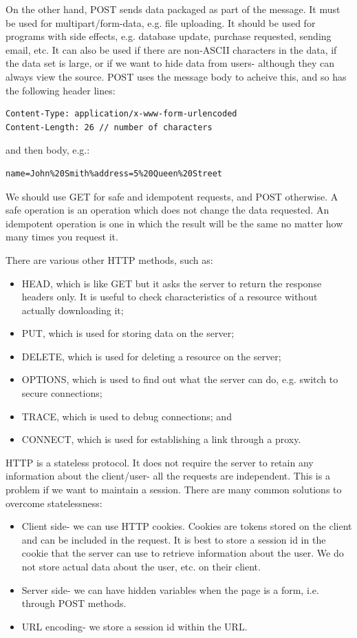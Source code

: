 \documentclass[a4paper, openany]{memoir}
\begin{document}
\noindent On the other hand, POST sends data packaged as part of the message. It must be used for multipart/form-data, e.g. file uploading. It should be used for programs with side effects, e.g. database update, purchase requested, sending email, etc. It can also be used if there are non-ASCII characters in the data, if the data set is large, or if we want to hide data from users- although they can always view the source. POST uses the message body to acheive this, and so has the following header lines:
\begin{verbatim}
Content-Type: application/x-www-form-urlencoded
Content-Length: 26 // number of characters
\end{verbatim}
and then body, e.g.:
\begin{verbatim}
name=John%20Smith%address=5%20Queen%20Street
\end{verbatim}
We should use GET for safe and idempotent requests, and POST otherwise. A safe operation is an operation which does not change the data requested. An idempotent operation is one in which the result will be the same no matter how many times you request it.

\noindent There are various other HTTP methods, such as:
\begin{itemize}
    \item HEAD, which is like GET but it asks the server to return the response headers only. It is useful to check characteristics of a resource without actually downloading it;
    \item PUT, which is used for storing data on the server;
    \item DELETE, which is used for deleting a resource on the server;
    \item OPTIONS, which is used to find out what the server can do, e.g. switch to secure connections;
    \item TRACE, which is used to debug connections; and
    \item CONNECT, which is used for establishing a link through a proxy.
\end{itemize}
HTTP is a stateless protocol. It does not require the server to retain any information about the client/user- all the requests are independent. This is a problem if we want to maintain a session. There are many common solutions to overcome statelessness:
\begin{itemize}
    \item Client side- we can use HTTP cookies. Cookies are tokens stored on the client and can be included in the request. It is best to store a session id in the cookie that the server can use to retrieve information about the user. We do not store actual data about the user, etc. on their client.
    \item Server side- we can have hidden variables when the page is a form, i.e. through POST methods.
    \item URL encoding- we store a session id within the URL.
\end{itemize}
\newpage
\end{document}
